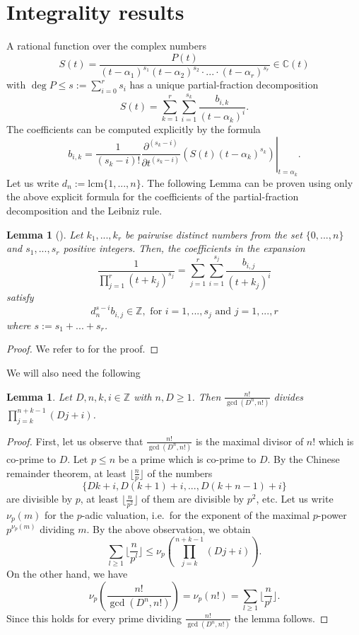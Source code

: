 \documentclass[11pt]{amsart}
\theoremstyle{plain}
\newtheorem{lem}[thm]{Lemma}
\theoremstyle{remark}
\theoremstyle{definition}
\newcommand{\ZZ}{\mathbb{Z}}
\newcommand{\lcm}{\mathrm{lcm}}
\begin{document}
\section{Integrality results}
A rational function over the complex numbers
\[
	S(t)=\frac{P(t)}{(t-\alpha_1)^{s_1}(t-\alpha_2)^{s_2}\cdot...\cdot(t-\alpha_r)^{s_r}}\in\mathbb{C}(t)
\]
with $\deg P\leq s:=\sum_{i=0}^r s_i$ has a unique partial-fraction decomposition
\[
	S(t)=\sum_{k=1}^r\sum_{i=1}^{s_k}\frac{b_{i,k}}{(t-\alpha_k)^i}.
\]
The coefficients can be computed explicitly by the formula
\[
	b_{i,k}=\left.\frac{1}{(s_k-i)!}\frac{\partial^{(s_k-i)}}{\partial t^{(s_k-i)}}\left( S(t)(t-\alpha_k)^{s_k} \right)\right|_{t=\alpha_k}.
\]
Let us write $d_n:=\lcm\{1,...,n\}$. The following Lemma can be proven using only the above explicit formula for the coefficients of the partial-fraction decomposition and the Leibniz rule.
\begin{lem}[{\cite[Lemma 1]{zudilin}}]\label{lem1}
 Let $k_1,...,k_r$ be pairwise distinct numbers from the set $\{0,...,n\}$ and $s_1,...,s_r$ positive integers. Then, the coefficients in the expansion
 \[
 	\frac{1}{\prod_{j=1}^r(t+k_j)^{s_j}}=\sum_{j=1}^r\sum_{i=1}^{s_j}\frac{b_{i,j}}{(t+k_j)^i}
 \]
 satisfy
 \[
 	d_n^{s-i}b_{i,j}\in \ZZ, \text{ for } i=1,...,s_j \text{ and } j=1,...,r
 \]
 where $s:=s_1+...+s_r$.
\end{lem}
\begin{proof}
We refer to \cite[Lemma 1]{zudilin} for the proof.
\end{proof}
We will also need the following
\begin{lem}\label{lem2}
	Let $D,n,k,i\in\ZZ$ with $n,D\geq 1$. Then $\frac{n!}{\gcd(D^n,n!)}$ divides $\prod_{j=k}^{n+k-1}(Dj+i)$.
\end{lem}
\begin{proof}
First, let us observe that $\frac{n!}{\gcd(D^n,n!)}$ is the maximal divisor of $n!$ which is co-prime to $D$. Let $p\leq n$ be a prime which is co-prime to $D$. By the Chinese remainder theorem, at least $\lfloor\frac{n}{p}\rfloor$ of the numbers
\[
	\{Dk+i,D(k+1)+i,...,D(k+n-1)+i\}
\]
are divisible by $p$, at least $\lfloor\frac{n}{p^2}\rfloor$ of them are divisible by $p^2$, etc. Let us write $\nu_p(m)$ for the $p$-adic valuation, i.e.~for the exponent of the maximal $p$-power $p^{\nu_p(m)}$ dividing $m$. By the above observation, we obtain
\[
	\sum_{l\geq 1} \lfloor\frac{n}{p^l}\rfloor\leq \nu_p\left(\prod_{j=k}^{n+k-1}(Dj+i)\right).
\]
On the other hand, we have
\[
	\nu_p\left(\frac{n!}{\gcd(D^n,n!)}\right)=\nu_p(n!)=\sum_{l\geq 1} \lfloor\frac{n}{p^l}\rfloor.
\]
Since this holds for every prime dividing $\frac{n!}{\gcd(D^n,n!)}$ the lemma follows.
\end{proof}
\end{document}
